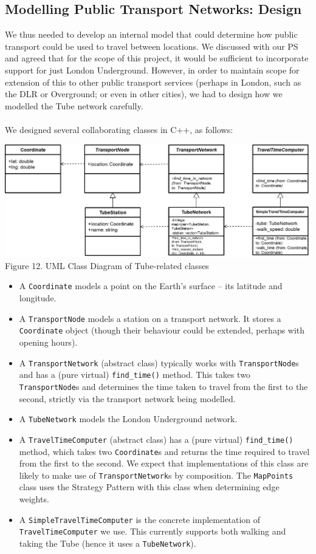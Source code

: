 \documentclass[a4paper, 10pt]{report}
\begin{document}
\subsection{Modelling Public Transport Networks: Design}
We thus needed to develop an internal model that could determine how public transport could be used to travel between locations. We discussed with our PS and agreed that for the scope of this project, it would be sufficient to incorporate support for just London Underground. However, in order to maintain scope for extension of this to other public transport services (perhaps in London, such as the DLR or Overground; or even in other cities), we had to design how we modelled the Tube network carefully. \\\\
We designed several collaborating classes in C++, as follows:
\begin{center}
\includegraphics[scale=0.6]{uml_tube.png}\\
Figure 12. UML Class Diagram of Tube-related classes
\end{center}
\begin{itemize}
\item A \texttt{Coordinate} models a point on the Earth's surface -- its latitude and longitude.
\item A \texttt{TransportNode} models a station on a transport network. It stores a \texttt{Coordinate} object (though their behaviour could be extended, perhaps with opening hours). 
\item A \texttt{TransportNetwork} (abstract class) typically works with \texttt{TransportNode}s and has a (pure virtual) \texttt{find\_time()} method. This takes two \texttt{TransportNode}s and determines the time taken to travel from the first to the second, strictly via the transport network being modelled.
\item A \texttt{TubeNetwork} models the London Underground network.
\item A \texttt{TravelTimeComputer} (abstract class) has a (pure virtual) \texttt{find\_time()} method, which takes two \texttt{Coordinate}s and returns the time required to travel from the first to the second. We expect that implementations of this class are likely to make use of \texttt{TransportNetwork}s by composition. The \texttt{MapPoints} class uses the Strategy Pattern with this class when determining edge weights.
\item A \texttt{SimpleTravelTimeComputer} is the concrete implementation of \texttt{TravelTimeComputer} we use. This currently supports both walking and taking the Tube (hence it uses a \texttt{TubeNetwork}).
\end{itemize}
\end{document}
